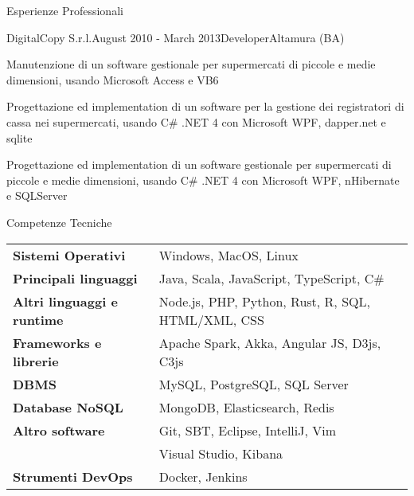 \documentclass{resume} %
\begin{document}
\begin{rSection}{Esperienze Professionali}
\begin{rSubsection}{DigitalCopy S.r.l.}{August 2010 - March 2013}{Developer}{Altamura (BA)}
\item Manutenzione di un software gestionale per supermercati di piccole e medie dimensioni, usando Microsoft Access e VB6
\item Progettazione ed implementation di un software per la gestione dei registratori di cassa nei supermercati, usando C\# .NET 4 con Microsoft WPF, dapper.net e sqlite
\item Progettazione ed implementation di un software gestionale per supermercati di piccole e medie dimensioni, usando C\# .NET 4 con Microsoft WPF, nHibernate e SQLServer
\end{rSubsection}

\end{rSection}


\begin{rSection}{Competenze Tecniche}

\begin{tabular}{ @{} >{\bfseries}l @{\hspace{6ex}} l }
Sistemi Operativi & Windows, MacOS, Linux \\
Principali linguaggi & Java, Scala, JavaScript, TypeScript, C\# \\
Altri linguaggi e runtime & Node.js, PHP, Python, Rust, R, SQL, HTML/XML, CSS \\
Frameworks e librerie & Apache Spark, Akka, Angular JS, D3js, C3js \\
DBMS & MySQL, PostgreSQL, SQL Server \\
Database NoSQL & MongoDB, Elasticsearch, Redis \\
Altro software & Git, SBT, Eclipse, IntelliJ, Vim \\
& Visual Studio, Kibana \\
Strumenti DevOps & Docker, Jenkins \\
\end{tabular}

\end{rSection}

\end{document}

